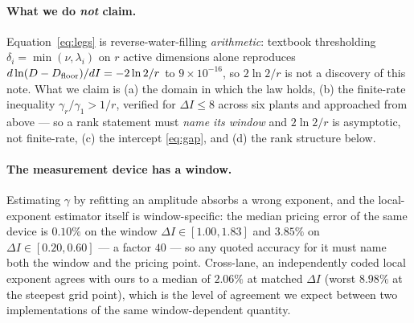 \documentclass[journal]{IEEEtran}
\theoremstyle{remark}
\begin{document}
\paragraph{What we do \emph{not} claim.} Equation~\eqref{eq:legs} is
reverse-water-filling \emph{arithmetic}: textbook thresholding
$\delta_i=\min(\nu,\lambda_i)$ on $r$ active dimensions alone reproduces
$d\ln(D-D_{\rm floor})/dI=-2\ln2/r$ to $9\times10^{-16}$, so $2\ln2/r$ is not a
discovery of this note. What we claim is (a) the domain in which the law holds,
(b) the finite-rate inequality $\gamma_r/\gamma_1>1/r$, verified for
$\Delta I\le8$ across six plants and approached from above --- so a rank statement
must \emph{name its window} and $2\ln2/r$ is asymptotic, not finite-rate, (c) the
intercept \eqref{eq:gap}, and (d) the rank structure below.

\paragraph{The measurement device has a window.} Estimating $\gamma$ by refitting
an amplitude absorbs a wrong exponent, and the local-exponent estimator itself is
window-specific: the median pricing error of the same device is $0.10\%$ on the
window $\Delta I\in[1.00,1.83]$ and $3.85\%$ on $\Delta I\in[0.20,0.60]$ --- a
factor $40$ --- so any quoted accuracy for it must name both the window and the
pricing point. Cross-lane, an independently coded local exponent agrees with ours
to a median of $2.06\%$ at matched $\Delta I$ (worst $8.98\%$ at the steepest grid
point), which is the level of agreement we expect between two implementations of
the same window-dependent quantity.
\end{document}
